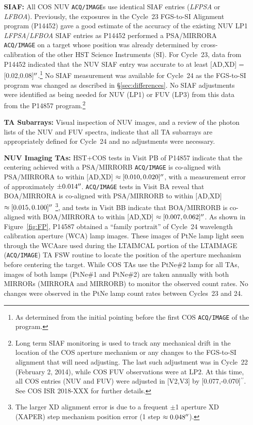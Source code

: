 \documentclass[12pt]{reportj}
\def\arcsec{\hbox{$^{\prime\prime}$}}
\newcommand{\pid}[1]{{\rm P}#1}
\newcommand{\tacq}[1]{\texttt{ACQ/#1}}
\newcommand{\tamonISR}[1]{COS ISR 2018-XXX}
\begin{document}
\begin{description}
\item{\bf SIAF:}{
	All COS NUV \tacq{IMAGE}s use identical SIAF entries ({\it LFPSA} or {\it LFBOA}).
	Previously, the exposures in the Cycle~23 FGS-to-SI Alignment program (\pid{14452}) gave a good estimate of the accuracy of the existing NUV LP1 {\it LFPSA}/{\it LFBOA} SIAF entries
	as \pid{14452} performed a PSA/MIRRORA \tacq{IMAGE} on a target whose position was already determined by cross-calibration of the other HST Science Instruments (SI).
	For Cycle~23, data from \pid{14452} indicated that the NUV SIAF entry was accurate to at least [AD,XD] = [0.02,0.08]$\arcsec$.\footnote{As determined from the initial pointing before the first COS \tacq{IMAGE} of the program.}
	No SIAF measurement was available for Cycle~24 as the FGS-to-SI program was changed as described in \S\ref{sec:differences}. 
	No SIAF adjustments were identified as being needed for NUV (LP1) or FUV (LP3) from this data from the \pid{14857} program.\footnote{Long term SIAF monitoring is used to track any mechanical drift in the location of the COS aperture mechanism or any changes to the FGS-to-SI alignment that will need adjusting.
	The last such adjustment was in Cycle~22 (February 2, 2014), while COS FUV observations were at LP2. At this time, all COS entries (NUV and FUV) were adjusted in [V2,V3] by [0.077,-0.070]\arcsec.  See \tamonISR{} for further details. }
}
\item{\bf TA Subarrays:} Visual inspection of NUV images, and a review of the photon lists of the NUV and FUV spectra, indicate that all TA subarrays are appropriately defined for Cycle~24 and no adjustments were necessary.
\item{\bf NUV Imaging TAs:}
	HST+COS tests in Visit PB of \pid{14857} indicate that the centering achieved with a PSA/MIRRORB \tacq{IMAGE} is co-aligned with PSA/MIRRORA  to within [AD,XD] $\approx [0.010,0.020]\arcsec$, with a measurement error of approximately $\pm0.014\arcsec$.
	\tacq{IMAGE} tests in Visit BA reveal that BOA/MIRRORA is co-aligned with PSA/MIRRORB to within [AD,XD] $\approx [0.015,0.100]\arcsec$
	\footnote{The larger XD alignment error is due to a frequent $\pm$1 aperture XD (XAPER) step mechanism position error (1 step $\approx 0.048\arcsec$).}, and tests in Visit BB indicate that BOA/MIRRORB is co-aligned with BOA/MIRRORA to within [AD,XD] $\approx[0.007,0.062]\arcsec$. As shown in Figure~\ref{fig:FP}, \pid{14587} obtained a ``family portrait'' of Cycle~24 wavelength calibration aperture (WCA) lamp images. These images of PtNe lamp light seen through the WCAare used during the LTAIMCAL portion of the LTAIMAGE (\tacq{IMAGE}) TA FSW routine to locate the position of the aperture mechanism before centering the target. While COS TAs use the PtNe\#2 lamp for all TAs, images of both lamps (PtNe\#1 and PtNe\#2) are taken annually with both MIRRORs (MIRRORA and MIRRORB) to monitor the observed count rates. No changes were observed in the PtNe lamp count rates between Cycles~23 and 24.

\end{description}
\end{document}
